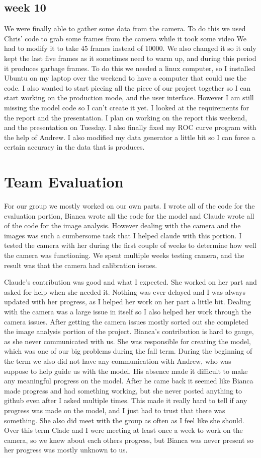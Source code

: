 \documentclass[onecolumn, draftclsnofoot,10pt, compsoc]{IEEEtran}
\begin{document}
\subsection{week 10}
We were finally able to gather some data from the camera. To do this we used Chris' code to grab some frames from the camera while it took some video We had to modify it to take 45 frames instead of 10000. We also changed it so it only kept the last five frames as it sometimes need to warm up, and during this period it produces garbage frames. To do this we needed a linux computer, so I installed Ubuntu on my laptop over the weekend to have a computer that could use the code. I also wanted to start piecing all the piece of our project together so I can start working on the production mode, and the user interface. However I am still missing the model code so I can't create it yet. I looked at the requirements for the report and the presentation. I plan on working on the report this weekend, and the presentation on Tuesday. I also finally fixed my ROC curve program with the help of Andrew. I also modified my data generator a little bit so I can force a certain accuracy in the data that is produces.

\section{Team Evaluation}
For our group we mostly worked on our own parts. I wrote all of the code for the evaluation portion, Bianca wrote all the code for the model and Claude wrote all of the code for the image analysis. However dealing with the camera and the images was such a cumbersome task that I helped claude with this portion. I tested the camera with her during the first couple of weeks to determine how well the camera was functioning. We spent multiple weeks testing camera, and the result was that the camera had calibration issues.

Claude’s contribution was good and what I expected. She worked on her part and asked for help when she needed it. Nothing was ever delayed and I was always updated with her progress, as I helped her work on her part a little bit. Dealing with the camera was a large issue in itself so I also helped her work through the camera issues. After getting the camera issues mostly sorted out she completed the image analysis portion of the project.
Bianca’s contribution is hard to gauge, as she never communicated with us. She was responsible for creating the model, which was one of our big problems during the fall term. During the beginning of the term we also did not have any communication with Andrew, who was suppose to help guide us with the model. His absence made it difficult to make any meaningful progress on the model. After he came back it seemed like Bianca made progress and had something working, but she never posted anything to github even after I asked multiple times. This made it really hard to tell if any progress was made on the model, and I just had to trust that there was something. She also did meet with the group as often as I feel like she should. Over this term Clade and I were meeting at least once a week to work on the camera, so we knew about each others progress, but Bianca was never present so her progress was mostly unknown to us.
\end{document}
